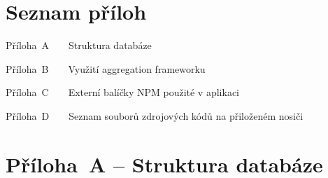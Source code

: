 \documentclass[a4paper,12pt]{article}
\begin{document}


\clearpage {} {}
\section*{Seznam příloh}

\noindent Příloha~A~~~~Struktura databáze \dotfill \pageref{prilohaA}

\noindent Příloha~B~~~~Využití aggregation frameworku \dotfill \pageref{prilohaB}

\noindent Příloha~C~~~~Externí balíčky NPM použité v aplikaci \dotfill \pageref{prilohaC}

\noindent Příloha~D~~~~Seznam souborů zdrojových kódů na přiloženém nosiči \dotfill \pageref{prilohaD}

\clearpage {}\label{prilohaA} 

\section*{Příloha~A --  Struktura databáze}
\end{document}
